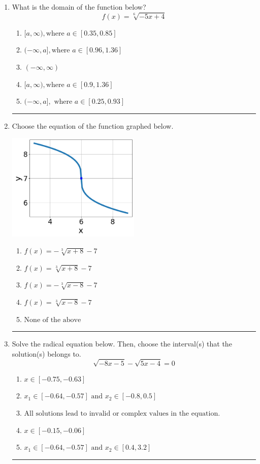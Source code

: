 \documentclass[14pt]{extbook}
\newcommand{\litem}[1]{\item#1\hspace*{-1cm}\rule{\textwidth}{0.4pt}}
\begin{document}
\begin{enumerate}
{\begin{enumerate}[label=\Alph*.]
\end{enumerate} }
\litem{
What is the domain of the function below?\[ f(x) = \sqrt[6]{-5 x + 4} \]\begin{enumerate}[label=\Alph*.]
\item \( [a, \infty), \text{where } a \in [0.35, 0.85] \)
\item \( (-\infty, a], \text{where } a \in [0.96, 1.36] \)
\item \( (-\infty, \infty) \)
\item \( [a, \infty), \text{where } a \in [0.9, 1.36] \)
\item \( (-\infty, a], \text{ where } a \in [0.25, 0.93] \)

\end{enumerate} }
\litem{
Choose the equation of the function graphed below.
\begin{center}
    \includegraphics[width=0.5\textwidth]{../Figures/radicalGraphToEquationA.png}
\end{center}
\begin{enumerate}[label=\Alph*.]
\item \( f(x) = - \sqrt[3]{x + 8} - 7 \)
\item \( f(x) = \sqrt[3]{x + 8} - 7 \)
\item \( f(x) = - \sqrt[3]{x - 8} - 7 \)
\item \( f(x) = \sqrt[3]{x - 8} - 7 \)
\item \( \text{None of the above} \)

\end{enumerate} }
\litem{
Solve the radical equation below. Then, choose the interval(s) that the solution(s) belongs to.\[ \sqrt{-8 x - 5} - \sqrt{5 x - 4} = 0 \]\begin{enumerate}[label=\Alph*.]
\item \( x \in [-0.75,-0.63] \)
\item \( x_1 \in [-0.64, -0.57] \text{ and } x_2 \in [-0.8,0.5] \)
\item \( \text{All solutions lead to invalid or complex values in the equation.} \)
\item \( x \in [-0.15,-0.06] \)
\item \( x_1 \in [-0.64, -0.57] \text{ and } x_2 \in [0.4,3.2] \)

\end{enumerate} }
\end{enumerate}
\end{document}
